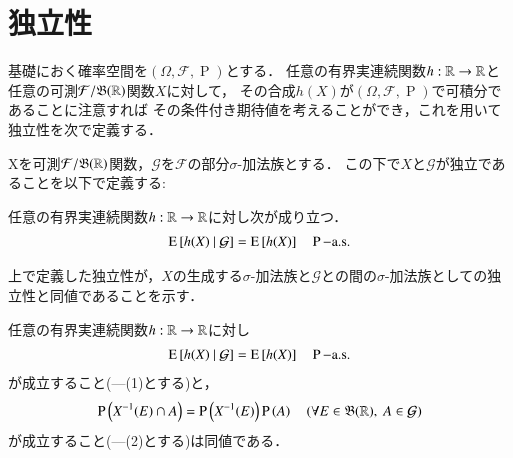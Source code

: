 \section{独立性}
	基礎におく確率空間を$(\Omega,\mathcal{F},\operatorname{P})$とする．
	任意の有界実連続関数$h:\mathbb{R} \rightarrow \mathbb{R}$と任意の可測$\mathcal{F}/\mathfrak{B}(\mathbb{R})$関数$X$に対して，
	その合成$h(X)$が$(\Omega,\mathcal{F},\operatorname{P})$で可積分であることに注意すれば
	その条件付き期待値を考えることができ，これを用いて独立性を次で定義する．
	
	\begin{dfn}[独立性]
		Xを可測$\mathcal{F}/\mathfrak{B}(\mathbb{R})$関数，$\mathcal{G}$を$\mathcal{F}$の部分$\sigma$-加法族とする．
		この下で$X$と$\mathcal{G}$が独立であることを以下で定義する:
		
		任意の有界実連続関数$h:\mathbb{R} \rightarrow \mathbb{R}$に対し次が成り立つ．
		\begin{align}
			\operatorname{E} \left[ h(X) \ \middle|\ \mathcal{G} \right] = \operatorname{E} \left[ h(X) \right] \quad \operatorname{P}\mathrm{-a.s.}
		\end{align}
	\end{dfn}
	
	上で定義した独立性が，$X$の生成する$\sigma$-加法族と$\mathcal{G}$との間の$\sigma$-加法族としての独立性と同値であることを示す．
	
	\begin{prp}[独立性の同値条件]
		任意の有界実連続関数$h:\mathbb{R} \rightarrow \mathbb{R}$に対し
		\begin{align}
			\operatorname{E} \left[ h(X) \ \middle|\ \mathcal{G} \right] = \operatorname{E} \left[ h(X) \right] \quad \operatorname{P}\mathrm{-a.s.}
		\end{align}
		が成立すること(---(1)とする)と，
		\begin{align}
			\operatorname{P} \left(X^{-1}(E) \cap A\right) = \operatorname{P} \left(X^{-1}(E)\right)\operatorname{P} \left(A\right) \quad (\forall E \in \mathfrak{B}(\mathbb{R}),\ A \in \mathcal{G})
		\end{align}
		が成立すること(---(2)とする)は同値である．
	\end{prp}
	

